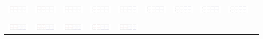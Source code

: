 \documentclass[]{article}
\begin{document}
\begin{table}[h]
\begin{tabular}{| c | c | c | c | c | c | c | c | c | c |}
		\includegraphics[width=0.09\linewidth]{0.80_0.10.png} &
		\includegraphics[width=0.09\linewidth]{0.80_0.20.png} &
		\includegraphics[width=0.09\linewidth]{0.80_0.30.png} &
		\includegraphics[width=0.09\linewidth]{0.80_0.40.png} &
		\includegraphics[width=0.09\linewidth]{0.80_0.50.png} &
		\includegraphics[width=0.09\linewidth]{0.80_0.60.png} &
		\includegraphics[width=0.09\linewidth]{0.80_0.70.png} &
		\includegraphics[width=0.09\linewidth]{0.80_0.80.png} &
		\includegraphics[width=0.09\linewidth]{0.80_0.90.png} \\
		& & & & & & & & & \\
		\hline
		& & & & & & & & & \\
		\includegraphics[width=0.09\linewidth]{0.90_0.00.png} &
		\includegraphics[width=0.09\linewidth]{0.90_0.10.png} &
		\includegraphics[width=0.09\linewidth]{0.90_0.20.png} &
		\includegraphics[width=0.09\linewidth]{0.90_0.30.png} &
		\includegraphics[width=0.09\linewidth]{0.90_0.40.png} &

\end{tabular}
\end{table}
\end{document}
